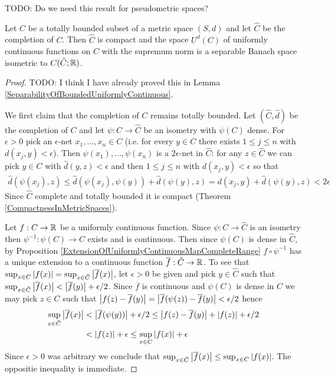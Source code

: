 TODO: Do we need this result for pseudometric spaces?
\begin{prop}\label{SpaceOfUniformlyContinuousFunctionsOnTotallyBoundedSet}Let $C$ be a totally bounded subset of a metric space $(S,d)$ and let $\hat{C}$ be the completion of $C$.  Then $\hat{C}$ is compact and the space $U^d(C)$ of uniformly continuous functions on $C$ with the supremum norm is a separable Banach space isometric to $C(\hat{C}; \mathbb{R})$.
\end{prop}
\begin{proof}
TODO: I think I have already proved this in Lemma \ref{SeparabilityOfBoundedUniformlyContinuous}.

We first claim that the completion of $C$ remains totally bounded.  Let $(\hat{C}, \hat{d})$ be the completion of $C$ and let $\psi : C \to \hat{C}$ be an isometry with $\psi(C)$ dense.  For $\epsilon > 0$ pick an $\epsilon$-net $x_1, \dotsc, x_n \in C$ (i.e. for every $y \in C$ there exists $1 \leq j \leq n$ with $d(x_j,y) < \epsilon$).  Then $\psi(x_1), \dotsc, \psi(x_n)$ is a $2\epsilon$-net in $\hat{C}$: for any $z \in \hat{C}$ we can pick $y \in C$ with $\hat{d}(y,z) < \epsilon$ and then $1 \leq j \leq n$ with $d(x_j,y) < \epsilon$ so that 
\begin{align*}
\hat{d}(\psi(x_j), z) \leq \hat{d}(\psi(x_j), \psi(y)) + \hat{d}(\psi(y), z) = d(x_j, y) + \hat{d}(\psi(y), z) < 2 \epsilon
\end{align*}
Since $\hat{C}$ complete and totally bounded it is compact (Theorem \ref{CompactnessInMetricSpaces}).  

Let $f : C \to \mathbb{R}$ be a uniformly continuous function.  Since $\psi : C \to \hat{C}$ is an isometry then $\psi^{-1} : \psi(C) \to C$ exists and is continuous.  Then since $\psi(C)$ is dense in $\hat{C}$, by Proposition \ref{ExtensionOfUniformlyContinuousMapCompleteRange} $f \circ \psi^{-1}$ has a unique extension to a continuous function $\overline{f} : \hat{C} \to \mathbb{R}$.  To see that $\sup_{x \in C} \left \vert f(x) \right \vert = \sup_{x \in \hat{C}} \left \vert \overline{f}(x) \right \vert$, let $\epsilon > 0$ be given and pick $y \in \hat{C}$ such that $\sup_{x \in \hat{C}} \left \vert \overline{f}(x) \right \vert < \left \vert \overline{f}(y) \right \vert + \epsilon/2$.  Since $\overline{f}$ is continuous and $\psi(C)$ is dense in $\hat{C}$ we may pick $z \in C$ such that $\left \vert f(z) - \overline{f}(y) \right \vert=\left \vert \overline{f}(\psi(z)) - \overline{f}(y) \right \vert<\epsilon/2$ hence 
\begin{align*}
\sup_{x \in \hat{C}} \left \vert \overline{f}(x) \right \vert &< \left \vert \overline{f}(\psi(y)) \right \vert + \epsilon/2 \leq \left \vert f(z) - \overline{f}(y) \right \vert + \left \vert f(z) \right \vert + \epsilon/2 \\
&< \left \vert f(z) \right \vert + \epsilon \leq \sup_{x \in C} \left \vert f(x) \right \vert + \epsilon 
\end{align*}
Since $\epsilon > 0$ was arbitrary we conclude that $\sup_{x \in \hat{C}} \left \vert \overline{f}(x) \right \vert \leq  \sup_{x \in C} \left \vert f(x) \right \vert$.  The oppositie inequality is immediate.


\end{proof}
